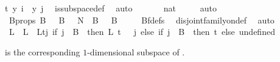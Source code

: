 \begin{isabellebody}
t{\isacharparenright}{\kern0pt}{\isacharparenright}{\kern0pt}\ y{\isacharparenright}{\kern0pt}\ i\ {\isacharequal}{\kern0pt}\ y\ j{\isacharparenright}{\kern0pt}{\isacharparenright}{\kern0pt}{\isachardoublequoteclose}\ \isamarkupfalse%
\ is{\isacharunderscore}{\kern0pt}subspace{\isacharunderscore}{\kern0pt}def\ \isamarkupfalse%
\ auto\ \isanewline
\isanewline
\ \ \ \ \isamarkupfalse%
\ {\isachardoublequoteopen}{\isacharbraceleft}{\kern0pt}{\isachardot}{\kern0pt}{\isachardot}{\kern0pt}{}{\isacharcolon}{\kern0pt}{\isacharcolon}{\kern0pt}nat{\isacharbraceright}{\kern0pt}\ {\isacharequal}{\kern0pt}\ {\isacharbraceleft}{\kern0pt}{}{\isacharcomma}{\kern0pt}\ {}{\isacharbraceright}{\kern0pt}{\isachardoublequoteclose}\ \isamarkupfalse%
\ auto\isanewline
\ \ \ \ \isamarkupfalse%
\ \isamarkupfalse%
\ B{\isacharunderscore}{\kern0pt}props{\isacharcolon}{\kern0pt}\ {\isachardoublequoteopen}B\ {}\ {\isasymunion}\ B\ {}\ {\isacharequal}{\kern0pt}\ {\isacharbraceleft}{\kern0pt}{\isachardot}{\kern0pt}{\isachardot}{\kern0pt}{\isacharless}{\kern0pt}N{\isacharprime}{\kern0pt}{\isacharbraceright}{\kern0pt}\ {\isasymand}\ {\isacharparenleft}{\kern0pt}B\ {}\ {\isasyminter}\ B\ {}\ {\isacharequal}{\kern0pt}\ {\isacharbraceleft}{\kern0pt}{\isacharbraceright}{\kern0pt}{\isacharparenright}{\kern0pt}{\isachardoublequoteclose}\ \isamarkupfalse%
\ Bf{\isacharunderscore}{\kern0pt}defs\ \isamarkupfalse%
\ disjoint{\isacharunderscore}{\kern0pt}family{\isacharunderscore}{\kern0pt}on{\isacharunderscore}{\kern0pt}def\ \isamarkupfalse%
\ auto\isanewline
\ \ \ \ \isamarkupfalse%
\ L{\isacharprime}{\kern0pt}\ \ {\isachardoublequoteopen}L{\isacharprime}{\kern0pt}\ {\isasymequiv}\ L{\isacharparenleft}{\kern0pt}t{\isacharcolon}{\kern0pt}{\isacharequal}{\kern0pt}{\isacharparenleft}{\kern0pt}{\isasymlambda}j{\isachardot}{\kern0pt}\ if\ j\ {\isasymin}\ B\ {}\ then\ L\ {\isacharparenleft}{\kern0pt}t\ {\isacharminus}{\kern0pt}\ {}{\isacharparenright}{\kern0pt}\ j\ else\ {\isacharparenleft}{\kern0pt}if\ j\ {\isasymin}\ B\ {}\ then\ t\ else\ undefined{\isacharparenright}{\kern0pt}{\isacharparenright}{\kern0pt}{\isacharparenright}{\kern0pt}{\isachardoublequoteclose}%
\begin{isamarkuptext}%
 is the corresponding $1$-dimensional subspace of .%

\end{isamarkuptext}
\end{isabellebody}

